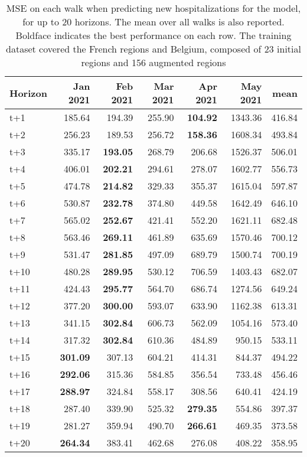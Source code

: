 \begin{table}[H]
\centering
\caption{MSE on each walk when predicting new hospitalizations for the model, for up to 20 horizons. The mean over all walks is also reported. Boldface indicates the best performance on each row. The training dataset covered the French regions and Belgium, composed of 23 initial regions and 156 augmented regions }
\label{tab:MSE_walk_encoder_decoder}
\begin{tabular}{lrrrrrr}
\toprule
Horizon &  Jan 2021 &  Feb 2021 &  Mar 2021 &  Apr 2021 &  May 2021 &   mean \\
\midrule
t+1  & 185.64  & 194.39  & 255.90  & \textbf{104.92}  & 1343.36  & 416.84  \\
t+2  & 256.23  & 189.53  & 256.72  & \textbf{158.36}  & 1608.34  & 493.84  \\
t+3  & 335.17  & \textbf{193.05}  & 268.79  & 206.68  & 1526.37  & 506.01  \\
t+4  & 406.01  & \textbf{202.21}  & 294.61  & 278.07  & 1602.77  & 556.73  \\
t+5  & 474.78  & \textbf{214.82}  & 329.33  & 355.37  & 1615.04  & 597.87  \\
t+6  & 530.87  & \textbf{232.78}  & 374.80  & 449.58  & 1642.49  & 646.10  \\
t+7  & 565.02  & \textbf{252.67}  & 421.41  & 552.20  & 1621.11  & 682.48  \\
t+8  & 563.46  & \textbf{269.11}  & 461.89  & 635.69  & 1570.46  & 700.12  \\
t+9  & 531.47  & \textbf{281.85}  & 497.09  & 689.79  & 1500.74  & 700.19  \\
t+10  & 480.28  & \textbf{289.95}  & 530.12  & 706.59  & 1403.43  & 682.07  \\
t+11  & 424.43  & \textbf{295.77}  & 564.70  & 686.74  & 1274.56  & 649.24  \\
t+12  & 377.20  & \textbf{300.00}  & 593.07  & 633.90  & 1162.38  & 613.31  \\
t+13  & 341.15  & \textbf{302.84}  & 606.73  & 562.09  & 1054.16  & 573.40  \\
t+14  & 317.32  & \textbf{302.84}  & 610.36  & 484.89  & 950.15  & 533.11  \\
t+15  & \textbf{301.09}  & 307.13  & 604.21  & 414.31  & 844.37  & 494.22  \\
t+16  & \textbf{292.06}  & 315.36  & 584.85  & 356.54  & 733.48  & 456.46  \\
t+17  & \textbf{288.97}  & 324.84  & 558.17  & 308.56  & 640.41  & 424.19  \\
t+18  & 287.40  & 339.90  & 525.32  & \textbf{279.35}  & 554.86  & 397.37  \\
t+19  & 281.27  & 359.94  & 490.70  & \textbf{266.61}  & 469.35  & 373.58  \\
t+20  & \textbf{264.34}  & 383.41  & 462.68  & 276.08  & 408.22  & 358.95  \\

\bottomrule
\end{tabular}
\end{table}
